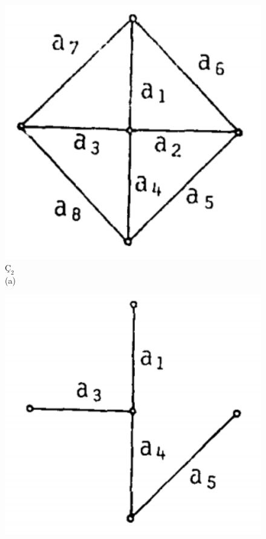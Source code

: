 \documentclass[11pt]{amsbook}
\begin{document}
\begin{figure}[h]
	    \centering
	    \begin{minipage}{0.32\textwidth}
    	\includegraphics[width=\textwidth]{images/ceyhun-001-10-fig01}
    	\centering$Ç_2$ \\
    	\centering(a)
        \end{minipage}
        \begin{minipage}{0.32\textwidth}
	    \includegraphics[width=\textwidth]{images/ceyhun-001-10-fig02}

\end{minipage}
\end{figure}
\end{document}
